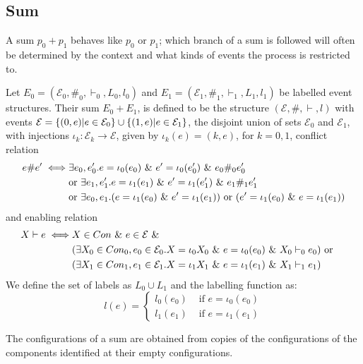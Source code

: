 \documentclass{article}
\begin{document}
\subsection{Sum}
A sum $p_0 + p_1$ behaves like $p_0$ or $p_1$; which branch of a sum is followed will
often be determined by the context and what kinds of events the process is restricted to.

\begin{definition}
    Let $E_0 = (\mathcal{E}_0,\#_0,\vdash_0,L_0,l_0)$ and
    $E_1 = (\mathcal{E}_1,\#_1,\vdash_1,L_1,l_1)$ be labelled event structures.
    Their sum $E_0 + E_1$, is defined to be the structure $(\mathcal{E},\#,\vdash,l)$
    with events $\mathcal{E} = \{(0,e)|e \in \mathcal{E}_0\} \cup \{(1,e)|e \in \mathcal{E}_1\}$,
    the disjoint union of sets $\mathcal{E}_0$ and $\mathcal{E}_1$,
    with injections $\iota_k: \mathcal{E}_k \rightarrow \mathcal{E}$, given by
    $\iota_k(e) = (k,e)$, for $k=0,1$, conflict relation
    \begin{align*}
        e \# e' \iff & \exists e_0,e_0'. e = \iota_0(e_0)
        \ \& \  e' = \iota_0(e_0') \ \& \  e_0 \#_0e_0'                         \\
                     & \text{or } \exists e_1,e_1'. e = \iota_1(e_1) \ \& \ 
        e' = \iota_1(e_1') \ \& \  e_1 \#_1 e_1'                             \\
                     & \text{or } \exists e_0,e_1.(e=\iota_1(e_0)
        \ \& \  e' =\iota_1(e_1)) \text{ or }
        (e'=\iota_1(e_0) \ \& \  e =\iota_1(e_1))
    \end{align*}
    and enabling relation
    \begin{align*}
        X \vdash e \iff & X \in Con \ \& \  e \in \mathcal{E} \ \& \                        & \\
                        & (\exists X_0 \in Con_0,e_0 \in \mathcal{E}_0.X = \iota_0X_0
        \ \& \  e = \iota_0(e_0) \ \& \  X_0 \vdash_0 e_0) \text{ or }                        \\
                        & (\exists X_1 \in Con_1,e_1 \in \mathcal{E}_1.X = \iota_1X_1
        \ \& \  e = \iota_1(e_1) \ \& \  X_1 \vdash_1 e_1)                                    \\
    \end{align*}
    We define the set of labels as $L_0 \cup L_1$ and the labelling function as:
    $$
        l(e) = \begin{cases}
            l_0(e_0) & \text{ if } e = \iota_0(e_0) \\
            l_1(e_1) & \text{ if } e = \iota_1(e_1)
        \end{cases}
    $$
\end{definition}
The configurations of a sum are obtained from copies of the configurations of the components
identified at their empty configurations.
\end{document}
